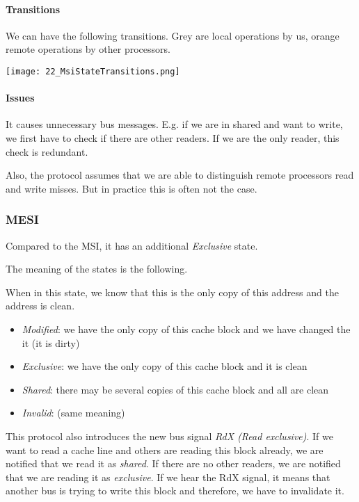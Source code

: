 \paragraph{Transitions}
We can have the following transitions. Grey are local operations by us, orange remote operations by other processors.

\texttt{[image: 22\_MsiStateTransitions.png]}

\paragraph{Issues}
It causes unnecessary bus messages. E.g. if we are in shared and want to write, we first have to check if there are other readers. If we are the only reader, this check is redundant.

Also, the protocol assumes that we are able to distinguish remote processors read and write misses. But in practice this is often not the case. 

\subsubsection{MESI}
Compared to the MSI, it has an additional \textit{Exclusive} state.

The meaning of the states is the following.

When in this state, we know that this is the only copy of this address and the address is clean. 

\begin{itemize}
    \item \textit{Modified}: we have the only copy of this cache block and we have changed the it (it is dirty)
    \item \textit{Exclusive}: we have the only copy of this cache block and it is clean
    \item \textit{Shared}: there may be several copies of this cache block and all are clean
    \item \textit{Invalid}: (same meaning)
\end{itemize}

This protocol also introduces the new bus signal \textit{RdX (Read exclusive)}. If we want to read a cache line and others are reading this block already, we are notified that we read it as \textit{shared}. If there are no other readers, we are notified that we are reading it as \textit{exclusive}. If we hear the RdX signal, it means that another bus is trying to write this block and therefore, we have to invalidate it. 


